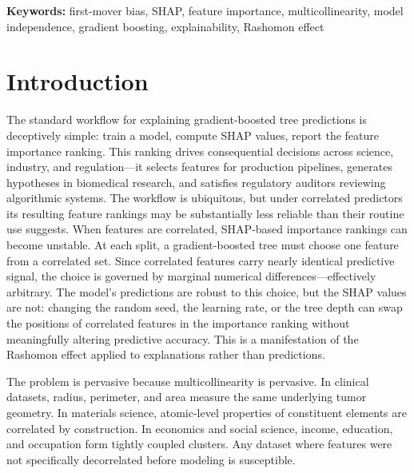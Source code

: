 \documentclass[11pt]{article}
\begin{document}
\smallskip
\noindent\textbf{Keywords:} first-mover bias, SHAP, feature importance,
multicollinearity, model independence, gradient boosting, explainability,
Rashomon effect


\section{Introduction}
\label{sec:introduction}

The standard workflow for explaining gradient-boosted tree predictions is
deceptively simple: train a model, compute SHAP values, report the feature
importance ranking. This ranking drives consequential decisions across
science, industry, and regulation---it selects features for production
pipelines, generates hypotheses in biomedical research, and satisfies
regulatory auditors reviewing algorithmic systems. The workflow is
ubiquitous, but under correlated predictors its resulting feature rankings may be
substantially less reliable than their routine use suggests. When features are correlated, SHAP-based importance rankings
can become unstable. At each split, a gradient-boosted tree must choose one
feature from a correlated set. Since correlated features carry nearly
identical predictive signal, the choice is governed by marginal numerical
differences---effectively arbitrary. The model's predictions are robust to
this choice, but the SHAP values are not: changing the random seed, the
learning rate, or the tree depth can swap the positions of correlated
features in the importance ranking without meaningfully altering predictive
accuracy. This is a manifestation of the Rashomon effect
\citep{breiman2001statistical} applied to explanations rather than
predictions.

The problem is pervasive because multicollinearity is pervasive. In
clinical datasets, radius, perimeter, and area measure the same underlying
tumor geometry. In materials science, atomic-level properties of
constituent elements are correlated by construction. In economics and
social science, income, education, and occupation form tightly coupled
clusters. Any dataset where features were not specifically decorrelated
before modeling is susceptible.
\end{document}

